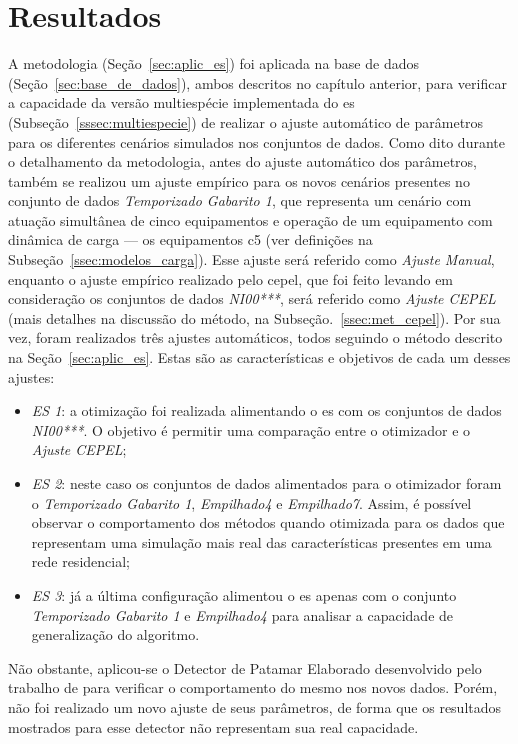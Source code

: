 \chapter{Resultados}%
\label{chap:resultados}

A metodologia (Seção~\ref{sec:aplic_es}) foi aplicada na base de dados
(Seção~\ref{sec:base_de_dados}), ambos descritos no capítulo anterior,
para verificar a capacidade da versão multiespécie implementada do
\acs{es} (Subseção~\ref{sssec:multiespecie}) de realizar o ajuste
automático de parâmetros para os diferentes cenários simulados nos
conjuntos de dados. Como dito durante o detalhamento da metodologia, antes do
ajuste automático dos
parâmetros, também se realizou um ajuste empírico para
os novos cenários presentes no conjunto de dados \emph{Temporizado
Gabarito 1}, que representa um cenário com atuação simultânea de
cinco equipamentos e operação de um equipamento com dinâmica de carga
--- os equipamentos \acs{c5} (ver definições na
Subseção~\ref{ssec:modelos_carga}). Esse ajuste será referido como
\emph{Ajuste Manual}, enquanto o ajuste empírico realizado pelo
\acs{cepel}, que foi feito levando em consideração os conjuntos de
dados \emph{NI00***}, será referido como \emph{Ajuste CEPEL} (mais
detalhes na discussão do método, na Subseção.~\ref{ssec:met_cepel}). Por sua
vez, foram realizados três ajustes automáticos, todos seguindo o método
descrito na Seção~\ref{sec:aplic_es}. Estas são as características e objetivos
de cada um desses ajustes:

\begin{itemize}
\item \emph{ES 1}: a otimização foi realizada alimentando o \acs{es} com
os conjuntos de dados \emph{NI00***}. O objetivo é permitir uma
comparação entre o otimizador e o \emph{Ajuste CEPEL};
\item \emph{ES 2}: neste caso os conjuntos de dados alimentados para o
otimizador foram o \emph{Temporizado Gabarito 1}, \emph{Empilhado4} e
\emph{Empilhado7}. Assim, é possível observar o comportamento dos
métodos quando otimizada para os dados que representam uma
simulação mais real das características presentes em uma rede
residencial;
\item \emph{ES 3}: já a última configuração alimentou o \acs{es}
apenas com o conjunto \emph{Temporizado Gabarito 1} e
\emph{Empilhado4} para analisar a capacidade de generalização do
algoritmo.
\end{itemize}

Não obstante, aplicou-se o Detector de Patamar Elaborado desenvolvido
pelo trabalho de \citet*{nilm_cepel_alvaro} para verificar o
comportamento do mesmo nos novos dados. Porém, não foi realizado um
novo ajuste de seus parâmetros, de forma que os resultados mostrados
para esse detector não representam sua real capacidade.

